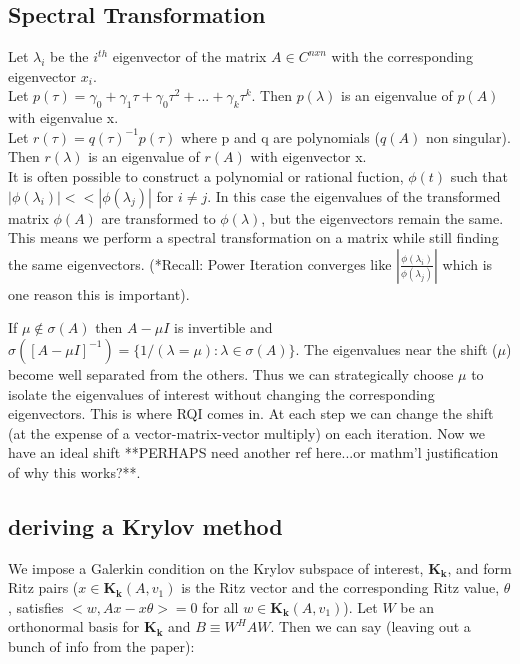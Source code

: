 \documentclass[12pt,twoside]{book}
\begin{document}
\subsection{Spectral Transformation}
Let $\lambda_{i}$ be the $i^{th}$ eigenvector of the matrix $A \in C^{n x n}$ with the corresponding eigenvector $x_{i}$. \\

\noindent Let $p(\tau)  = \gamma_{0} + \gamma_{1}\tau + \gamma_{0}\tau^{2} + ... + \gamma_{k}\tau^{k}$. Then $p(\lambda)$ is an eigenvalue of  $p(A)$ with eigenvalue x. \\
Let $r(\tau) = q(\tau)^{-1}p(\tau)$ where p and q are polynomials ($q(A)$ non singular). Then $r(\lambda)$ is an eigenvalue of $r(A)$ with eigenvector x.\\

It is often possible to construct a polynomial or rational fuction, $\phi(t)$ such that $|\phi(\lambda_{i})| << |\phi(\lambda_{j})|$ for $ i \ne j$. In this case the eigenvalues of the transformed matrix $\phi(A)$ are transformed to $\phi(\lambda)$, but the eigenvectors remain the same. This means we perform a spectral transformation on a matrix while still finding the same eigenvectors.  (*Recall: Power Iteration converges like $|\frac{\phi(\lambda_{i})}{\phi(\lambda_{j})}|$ which is one reason this is important).

If $\mu \notin \sigma(A)$ then $A - \mu I$ is invertible and $\sigma([A - \mu I]^{-1}) = \{ 1/(\lambda = \mu) : \lambda \in \sigma(A)\}$. The eigenvalues near the shift ($\mu$) become well separated from the others. Thus we can strategically choose $\mu$ to isolate the eigenvalues of interest without changing the corresponding eigenvectors. This is where RQI comes in. At each step we can change the shift (at the expense of a vector-matrix-vector multiply) on each iteration. Now we have an ideal shift **PERHAPS need another ref here...or mathm'l justification of why this works?**.

\subsection{deriving a Krylov method}
We impose a Galerkin condition on the Krylov subspace of interest, $\mathbf{K_{k}}$, and form Ritz pairs ($x \in \mathbf{K_{k}}(A, v_{1})$ is the Ritz vector and the corresponding Ritz value, $\theta$, satisfies $< w, Ax - x\theta > = 0 $ for all $w \in \mathbf{K_{k}}(A, v_{1})$). Let $W$ be an orthonormal basis for  $\mathbf{K_{k}}$ and $B \equiv W^{H}AW$. Then we can say (leaving out a bunch of info from the paper):\\
\end{document}
